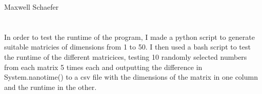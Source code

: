 \documentclass{article}
\begin{document}
    Maxwell Schaefer

    \section*{}
        In order to test the runtime of the program, I made a python script to generate suitable matricies of dimensions from 1 to 50. I then used a bash script to test the runtime of the different matricices, testing 10 randomly selected numbers from each matrix 5 times each and outputting the difference in System.nanotime() to a csv file with the dimensions of the matrix in one column and the runtime in the other.
\end{document}

